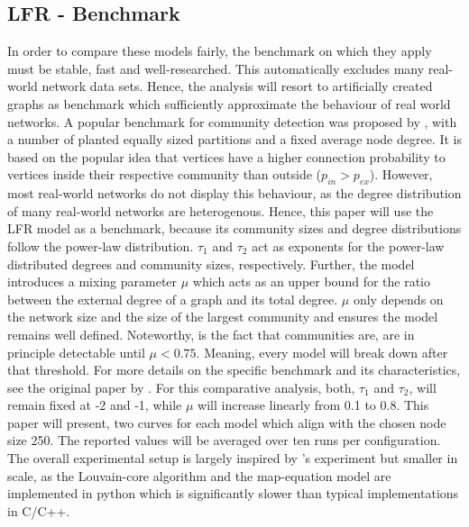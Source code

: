 \documentclass[11pt, twocolumn]{article}
\begin{document}
\subsection{LFR - Benchmark}
In order to compare these models fairly, the benchmark on which they apply must be stable, fast and well-researched. This automatically excludes many real-world network data sets. Hence, the analysis will resort to artificially created graphs as benchmark which sufficiently approximate the behaviour of real world networks. A popular benchmark for community detection was proposed by \citeauthor{girvan_CommunityStructureSocial_2002}, with a number of planted equally sized partitions and a fixed average node degree. It is based on the popular idea that vertices have a higher connection probability to vertices inside their respective community than outside ($p_{in} > p_{ex}$). However, most real-world networks do not display this behaviour, as the degree distribution of many real-world networks are heterogenous.\cite{lancichinetti_CommunityDetectionAlgorithms_2009} Hence, this paper will use the LFR model as a benchmark, because its community sizes and degree distributions follow the power-law distribution. $\tau_1$ and $\tau_2$ act as exponents for the power-law distributed degrees and community sizes, respectively. Further, the model introduces a mixing parameter $\mu$ which acts as an upper bound for the ratio between the external degree of a graph and its total degree. $\mu$ only depends on the network size and the size of the largest community and ensures the model remains well defined. Noteworthy, is the fact that communities are, are in principle detectable until $\mu<0.75$. Meaning, every model will break down after that threshold. For more details on the specific benchmark and its characteristics, see the original paper by \citeauthor{lancichinetti_CommunityDetectionAlgorithms_2009}. For this comparative analysis, both, $\tau_1$ and $\tau_2$, will remain fixed at -2 and -1, while $\mu$ will increase linearly from 0.1 to 0.8. This paper will present, two curves for each model which align with the chosen node size 250. The reported values will be averaged over ten runs per configuration. The overall experimental setup is largely inspired by \citeauthor{lancichinetti_CommunityDetectionAlgorithms_2009}'s experiment but smaller in scale, as the Louvain-core algorithm and the map-equation model are implemented in python which is significantly slower than typical implementations in C/C++.      
\end{document}
